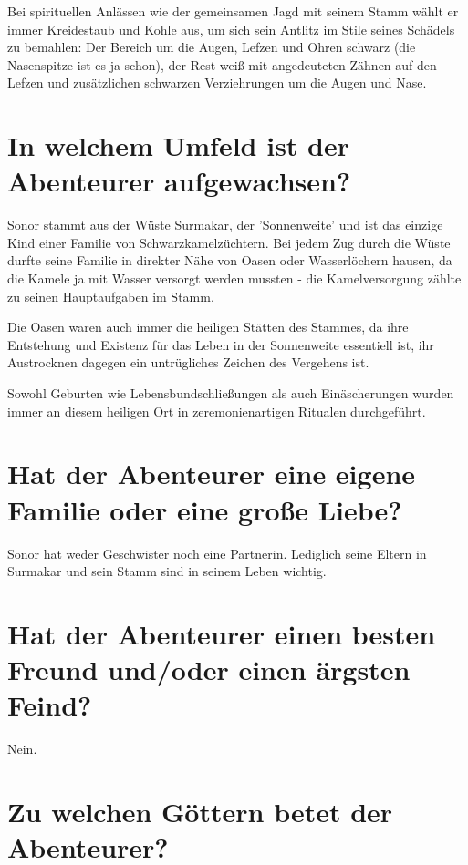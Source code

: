 \documentclass{article}
\begin{document}
	Bei spirituellen Anlässen wie der gemeinsamen Jagd mit seinem Stamm
	wählt er immer Kreidestaub und Kohle aus, um sich sein Antlitz im Stile
	seines Schädels zu bemahlen: Der Bereich um die Augen, Lefzen und Ohren schwarz
	(die Nasenspitze ist es ja schon), der Rest weiß mit angedeuteten Zähnen
	auf den Lefzen und zusätzlichen schwarzen Verziehrungen um die Augen und
	Nase.
	
	\section[Soziales Umfeld]{In welchem Umfeld ist der Abenteurer aufgewachsen?}
	
	Sonor stammt aus der Wüste Surmakar, der 'Sonnenweite' und ist das
	einzige Kind einer Familie von Schwarzkamelzüchtern. Bei jedem Zug durch
	die Wüste durfte seine Familie in direkter Nähe von Oasen oder
	Wasserlöchern hausen, da die Kamele ja mit Wasser versorgt werden
	mussten - die Kamelversorgung zählte zu seinen Hauptaufgaben im Stamm.

	Die Oasen waren auch immer die heiligen Stätten des Stammes, da ihre
	Entstehung und Existenz für das Leben in der Sonnenweite essentiell ist,
	ihr Austrocknen dagegen ein untrügliches Zeichen des Vergehens ist.
	
	Sowohl Geburten wie Lebensbundschließungen als auch Einäscherungen wurden immer
	an diesem heiligen Ort in zeremonienartigen Ritualen durchgeführt.


	\section[Beziehungsstatus]{Hat der Abenteurer eine eigene Familie oder eine große Liebe?}

	Sonor hat weder Geschwister noch eine Partnerin. Lediglich seine Eltern
	in Surmakar und sein Stamm sind in seinem Leben wichtig.


	\section[Freund und Feind]{Hat der Abenteurer einen besten Freund und/oder einen ärgsten Feind?}

	Nein.


	\section[Religion]{Zu welchen Göttern betet der Abenteurer?}
	
\end{document}
